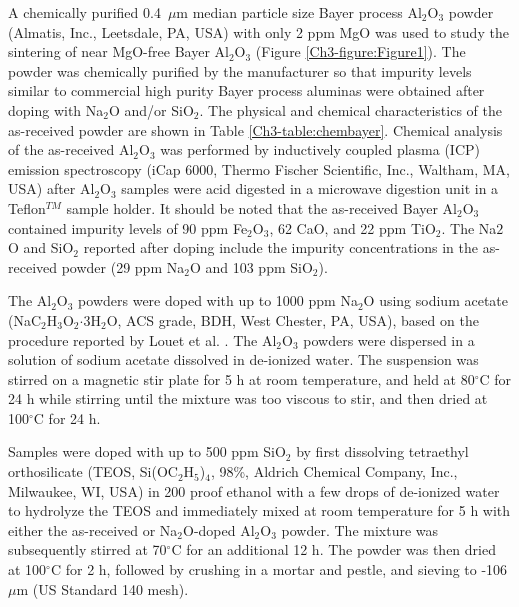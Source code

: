 A chemically purified 0.4 $\mu$m median particle size Bayer process Al$_{2}$O$_{3}$ powder (Almatis, Inc., Leetsdale, PA, USA) with only 2 ppm MgO was used to study the sintering of near MgO-free Bayer Al$_{2}$O$_{3}$ (Figure \ref{Ch3-figure:Figure1}). The powder was chemically purified by the manufacturer so that impurity levels similar to commercial high purity Bayer process aluminas were obtained after doping with Na$_{2}$O and/or SiO$_{2}$. The physical and chemical characteristics of the as-received powder are shown in Table \ref*{Ch3-table:chembayer}. Chemical analysis of the as-received Al$_{2}$O$_{3}$ was performed by inductively coupled plasma (ICP) emission spectroscopy (iCap 6000, Thermo Fischer Scientific, Inc., Waltham, MA, USA) after Al$_{2}$O$_{3}$ samples were acid digested in a microwave digestion unit in a Teflon$^{TM}$ sample holder.  It should be noted that the as-received Bayer Al$_{2}$O$_{3}$ contained impurity levels of 90 ppm Fe$_{2}$O$_{3}$, 62 CaO, and 22 ppm TiO$_{2}$.  The Na${2}$O and SiO$_{2}$ reported after doping include the impurity concentrations in the as-received powder (29 ppm Na$_{2}$O and 103 ppm SiO$_{2}$). 

The Al$_{2}$O$_{3}$ powders were doped with up to 1000 ppm Na$_{2}$O using sodium acetate (NaC$_{2}$H$_{3}$O$_{2}$$\cdot$3H$_{2}$O, ACS grade, BDH, West Chester, PA, USA), based on the procedure reported by Louet et al. \cite{Louet2005}. The Al$_{2}$O$_{3}$ powders were dispersed in a solution of sodium acetate dissolved in de-ionized water. The suspension was stirred on a magnetic stir plate for 5 h at room temperature, and held at 80$^{\circ}$C for 24 h while stirring until the mixture was too viscous to stir, and then dried at 100$^{\circ}$C for 24 h. 

Samples were doped with up to 500 ppm SiO$_{2}$ by first dissolving tetraethyl orthosilicate (TEOS, Si(OC$_{2}$H$_{5}$)$_{4}$, 98\%, Aldrich Chemical Company, Inc., Milwaukee, WI, USA) in 200 proof ethanol with a few drops of de-ionized water to hydrolyze the TEOS and immediately mixed at room temperature for 5 h with either the as-received or Na$_{2}$O-doped Al$_{2}$O$_{3}$ powder. The mixture was subsequently stirred at 70$^{\circ}$C for an additional 12 h. The powder was then dried at 100$^{\circ}$C for 2 h, followed by crushing in a mortar and pestle, and sieving to -106 $\mu$m (US Standard 140 mesh).

